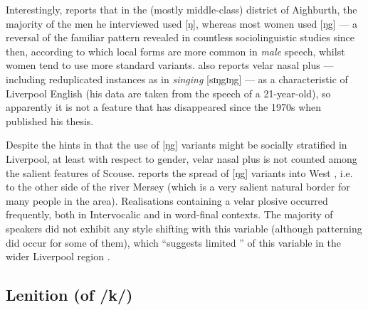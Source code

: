 Interestingly, \citeauthor{knowles1973} reports that in the (mostly middle-class) district of Aighburth, the majority of the men he interviewed used [ŋ], whereas most women used [ŋg] \citeyearpar[cf.][295]{knowles1973} --- a reversal of the familiar pattern revealed in countless sociolinguistic studies since then, according to which local forms are more common in \emph{male} speech, whilst women tend to use more standard variants.
\citet[352]{watson2007} also reports velar nasal plus --- including reduplicated instances as in \emph{singing} [sɪŋgɪŋg] --- as a characteristic of Liverpool English (his data are taken from the speech of a 21-year-old), so apparently it is not a feature that has disappeared since the 1970s when \citeauthor{knowles1973} published his thesis.

Despite the hints in \textcite{knowles1973} that the use of [ŋg] variants might be socially stratified in Liverpool, at least with respect to gender, velar nasal plus is not counted among the salient  features of Scouse.
\textcite[98]{newbrook1999} reports the spread of [ŋg] variants into West , i.e. to the other side of the river Mersey (which is a very salient  natural border for many people in the area).
Realisations containing a velar plosive occurred frequently, both in Intervocalic  and in word-final  contexts.
The majority of speakers did not exhibit any style shifting with this variable (although  patterning did occur for some of them), which ``suggests limited '' of this variable in the wider Liverpool region \parencite[98]{newbrook1999}.

		\subsection{Lenition (of /k/)}\label{sec.var.con.len}

